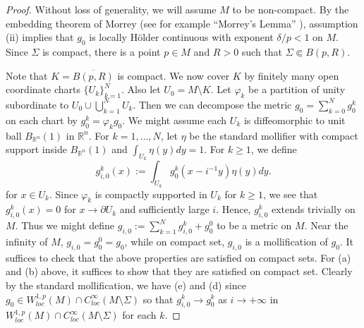 \documentclass[12pt]{amsart}
\theoremstyle{plain}
\theoremstyle{plain}
\theoremstyle{definition}
\theoremstyle{remark}
\numberwithin{equation}{subsection}
\newcommand{\hdel}{\tilde{\nabla}}
\begin{document}
\begin{proof}
%

Without loss of generality, we will assume $M$ to be non-compact.  By the embedding theorem of Morrey (see for example ``Morrey's Lemma''  \cite[(1.3) ]{adams_morrey_2015}), assumption (ii) implies that $g_0$ is locally H\"older continuous with exponent $\delta/p < 1$ on $M$.  Since $\Sigma$ is compact, there is a point $p \in M$ and $R > 0$ such that $\Sigma \Subset B(p,R)$. 


Note that $K=\overline{B(p,R)}$ is compact. We now cover $K$ by finitely many open coordinate charts $\{U_k\}_{k=1}^N$. Also let $U_0 = M \setminus K$. Let $\varphi_k$ be a partition of unity subordinate to $U_0 \cup \bigcup\limits_{k=1}^N U_k$. Then we can decompose the metric $g_0=\sum_{k=0}^N g^k_0$ on each chart by $g_0^k = \varphi_k g_0$. 
We might assume each $U_k$ is diffeomorphic to unit ball $B_{\mathbb{R}^n}(1)$ in $\mathbb{R}^n$. For $k = 1,\dots,N$, let $\eta$ be the standard mollifier with compact support inside $B_{\mathbb{R}^n}(1)$ and $\int_{U_k} \eta(y)dy = 1$. For $k\geq 1$, we define
    \begin{equation*}
        g_{i,0}^k(x) := \int_{U_k} g_0^k(x-i^{-1}y)\eta(y)dy.
    \end{equation*}
    for $x\in U_k$. Since $\varphi_k$ is compactly supported in $U_k$ for $k\geq 1$, we see that $g^k_{i,0}(x)=0$ for $x\to \partial U_k$ and sufficiently large $i$. Hence, $g^k_{i,0}$ extends trivially on $M$. Thus we might define
$
        g_{i,0}:= \sum\limits_{k=1}^N g_{i,0}^k + g_0^0$ to be a metric on $M$.
  Near the infinity of $M$, $g_{i,0}=g_0^0=g_0$, while on compact set, $g_{i,0}$ is a mollification of $g_0$. It suffices to check that the above properties are satisfied on compact sets. For (a) and (b) above, it suffices to show that they are satisfied on compact set. Clearly by the standard mollification, we have (e) and (d) since $g_0\in W^{1,p}_{loc}(M)\cap C^\infty_{loc}(M\setminus \Sigma)$ so that $g_{i,0}^k\to g_0^k$ as $i\to+\infty$ in  $W^{1,p}_{loc}(M)\cap C^\infty_{loc}(M\setminus \Sigma)$ for each $k$.
    

\end{proof}
\end{document}
